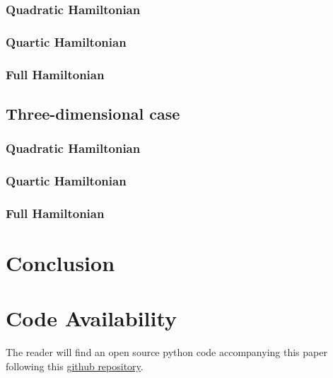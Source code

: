 \documentclass[reprint, amsmath, amssymb, aps]{revtex4-2}
\begin{document}
        \subsubsection{Quadratic Hamiltonian}
        \subsubsection{Quartic Hamiltonian}
        \subsubsection{Full Hamiltonian}

    \subsection{Three-dimensional case}
        \subsubsection{Quadratic Hamiltonian}
        \subsubsection{Quartic Hamiltonian}
        \subsubsection{Full Hamiltonian}
\section{Conclusion}

\begin{acknowledgments}

\end{acknowledgments}

\section*{Code Availability}

The reader will find an open source python code accompanying this paper following this \href{https://github.com/MatthieuSarkis/qdo}{github repository}.

\appendix

\nocite{*}


\end{document}
